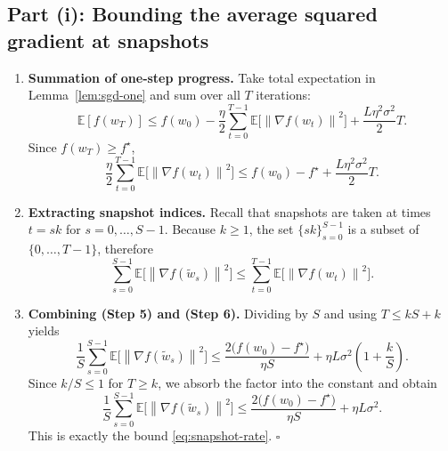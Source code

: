 \documentclass{article}
\newcommand{\EE}{\mathbb{E}}
\newcommand{\norm}[1]{\left\|#1\right\|}
\begin{document}
\subsection*{Part (i): Bounding the average squared gradient at snapshots}
\begin{enumerate}
    \item \textbf{Summation of one‑step progress.}  
    Take total expectation in Lemma~\ref{lem:sgd-one} and sum over all $T$ iterations:
    \[
    \EE[f(w_T)]\le f(w_0)-\frac{\eta}{2}\sum_{t=0}^{T-1}\EE\!\bigl[\norm{\nabla f(w_t)}^2\bigr]
                 +\frac{L\eta^2\sigma^2}{2}T .
    \tag{Step 4}
    \]
    Since $f(w_T)\ge f^{\star}$,
    \[
    \frac{\eta}{2}\sum_{t=0}^{T-1}\EE\!\bigl[\norm{\nabla f(w_t)}^2\bigr]
    \le f(w_0)-f^{\star}+ \frac{L\eta^2\sigma^2}{2}T .
    \tag{Step 5}
    \]
    \item \textbf{Extracting snapshot indices.}  
    Recall that snapshots are taken at times $t=sk$ for $s=0,\dots,S-1$.
    Because $k\ge 1$, the set $\{sk\}_{s=0}^{S-1}$ is a subset of $\{0,\dots,T-1\}$,
    therefore
    \[
    \sum_{s=0}^{S-1}\EE\!\bigl[\norm{\nabla f(\tilde w_{s})}^2\bigr]
    \le \sum_{t=0}^{T-1}\EE\!\bigl[\norm{\nabla f(w_t)}^2\bigr].
    \tag{Step 6}
    \]
    \item \textbf{Combining (Step 5) and (Step 6).}
    Dividing by $S$ and using $T\le kS+k$ yields
    \[
    \frac{1}{S}\sum_{s=0}^{S-1}\EE\!\bigl[\norm{\nabla f(\tilde w_{s})}^2\bigr]
    \le \frac{2\bigl(f(w_0)-f^{\star}\bigr)}{\eta S}
          +\eta L\sigma^2\!\left(1+\frac{k}{S}\right) .
    \tag{Step 7}
    \]
    Since $k/S\le 1$ for $T\ge k$, we absorb the factor into the constant and obtain
    \[
    \frac{1}{S}\sum_{s=0}^{S-1}\EE\!\bigl[\norm{\nabla f(\tilde w_{s})}^2\bigr]
    \le \frac{2\bigl(f(w_0)-f^{\star}\bigr)}{\eta S}
          +\eta L\sigma^2 .
    \tag{Step 8}
    \]
    This is exactly the bound \eqref{eq:snapshot-rate}. \hfill $\square$
\end{enumerate}
\end{document}
